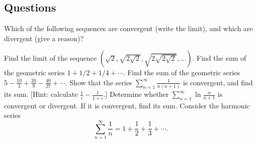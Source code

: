\subsection*{Questions}
\begin{questions}
  \questioM Which of the following sequences are convergent (write the limit), and which are divergent (give a reason)?
  \questioE Find the limit of the sequence $ (\sqrt{2}, \sqrt{2\sqrt{2}}, \sqrt{2\sqrt{2\sqrt{2}}}, \dots) $.
  \questioA Find the sum of the geometric series $ 1 + 1/2 + 1/4 + \cdots $.
  \questioM Find the sum of the geometric series $ 5 - \frac{10}{3} + \frac{20}{9} - \frac{40}{27} + \cdots $.
  \questioE Show that the series $ \sum_{n = 1}^{\infty} \frac{1}{n(n + 1)} $ is convergent, and find its sum. [Hint: calculate $ \frac{1}{i} - \frac{1}{1 + i} $.]
  \questioE Determine whether $ \sum_{n =1}^\infty \ln \frac{n}{n + 1} $ is convergent or divergent. If it is convergent, find its sum.
  \questioE Consider the harmonic series
            \begin{displaymath}
              \sum_{n = 1}^\infty \frac{1}{n} = 1 + \frac{1}{2} + \frac{1}{3} + \cdots.
            \end{displaymath}
    \begin{parts}

\end{parts}
\end{questions}
